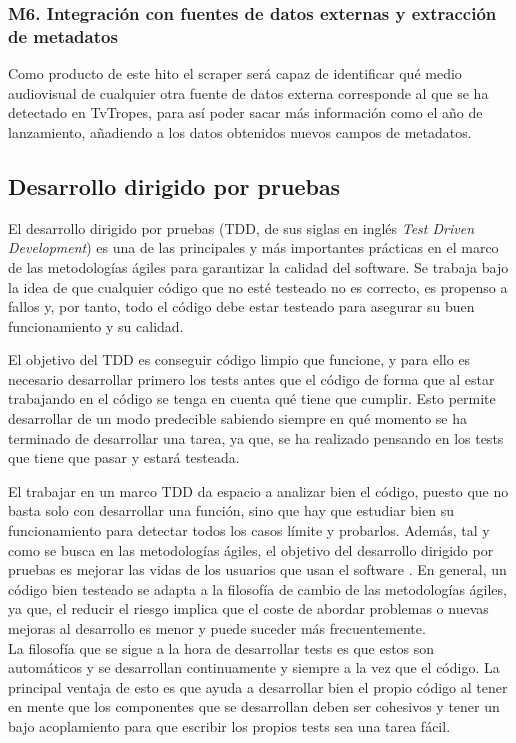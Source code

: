 \subsubsection{M6. Integración con fuentes de datos externas y extracción de metadatos}
Como producto de este hito el scraper será capaz de identificar qué medio audiovisual de cualquier otra fuente de datos externa corresponde al que se ha detectado en TvTropes, para así poder sacar más información como el año de lanzamiento, añadiendo a los datos obtenidos nuevos campos de metadatos.

\subsection{Desarrollo dirigido por pruebas}
El desarrollo dirigido por pruebas (TDD, de sus siglas en inglés \textit{Test Driven Development}) es una de las principales y más importantes prácticas en el marco de las metodologías ágiles para garantizar la calidad del software. Se trabaja bajo la idea de que cualquier código que no esté testeado no es correcto, es propenso a fallos y, por tanto, todo el código debe estar testeado para asegurar su buen funcionamiento y su calidad.

El objetivo del TDD es conseguir código limpio que funcione, y para ello es necesario desarrollar primero los tests antes que el código de forma que al estar trabajando en el código se tenga en cuenta qué tiene que cumplir. Esto permite desarrollar de un modo predecible sabiendo siempre en qué momento se ha terminado de desarrollar una tarea, ya que, se ha realizado pensando en los tests que tiene que pasar y estará testeada. 

El trabajar en un marco TDD da espacio a analizar bien el código, puesto que no basta solo con desarrollar una función, sino que hay que estudiar bien su funcionamiento para detectar todos los casos límite y probarlos. Además, tal y como se busca en las metodologías ágiles, el objetivo del desarrollo dirigido por pruebas es mejorar las vidas de los usuarios que usan el software \cite{beck2002driven}. En general, un código bien testeado se adapta a la filosofía de cambio de las metodologías ágiles, ya que, el reducir el riesgo implica que el coste de abordar problemas o nuevas mejoras al desarrollo es menor y puede suceder más frecuentemente.\\

La filosofía que se sigue a la hora de desarrollar tests es que estos son automáticos y se desarrollan continuamente y siempre a la vez que el código. La principal ventaja de esto es que ayuda a desarrollar bien el propio código al tener en mente que los componentes que se desarrollan deben ser cohesivos y tener un bajo acoplamiento para que escribir los propios tests sea una tarea fácil.

